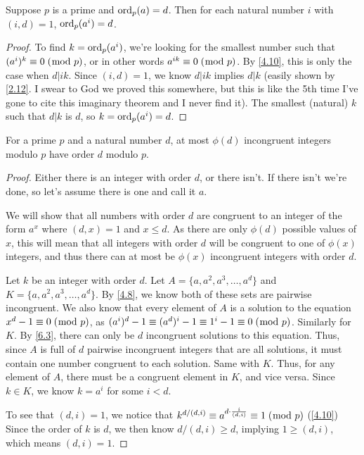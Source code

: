 \documentclass[../main.tex]{subfiles}
\begin{document}
\begin{thm} \label{6.4}
  Suppose $p$ is a prime and $\operatorname{ord}_p (a) = d$. Then for each natural number $i$ with $(i, d) = 1$, $\operatorname{ord}_p(a^i) = d$.
\end{thm}

\begin{proof}
  To find $k = \operatorname{ord}_p (a^i)$, we're looking for the smallest number such that $(a^i)^k \equiv 0 \; (\bmod \; p)$, or in other words $a^{ik} \equiv 0 \; (\bmod \; p)$. By \ref{4.10}, this is only the case when $d | ik$. Since $(i, d) = 1$, we know $d | ik$ implies $d | k$ (easily shown by \ref{2.12}. I swear to God we proved this somewhere, but this is like the 5th time I've gone to cite this imaginary theorem and I never find it). The smallest (natural) $k$ such that $d | k$ is $d$, so $k = \operatorname{ord}_p (a^i) = d$.
\end{proof}



\pagebreak



\begin{thm} \label{6.5}
  For a prime $p$ and a natural number $d$, at most $\phi (d)$ incongruent integers modulo $p$ have order $d$ modulo $p$.
\end{thm}

\begin{proof}
  Either there is an integer with order $d$, or there isn't. If there isn't we're done, so let's assume there is one and call it $a$.

  We will show that all numbers with order $d$ are congruent to an integer of the form $a^x$ where $(d, x) = 1$ and $x \leq d$. As there are only $\phi(d)$ possible values of $x$, this will mean that all integers with order $d$ will be congruent to one of $\phi(x)$ integers, and thus there can at most be $\phi(x)$ incongruent integers with order $d$.

  Let $k$ be an integer with order $d$. Let $A = \{a, a^2, a^3, \ldots, a^d\}$ and $K = \{a, a^2, a^3, \ldots, a^d\}$. By \ref{4.8}, we know both of these sets are pairwise incongruent. We also know that every element of $A$ is a solution to the equation $x^d - 1 \equiv 0 \; (\bmod \; p)$, as $(a^i)^d - 1 \equiv (a^d)^i - 1 \equiv 1^i - 1 \equiv 0 \; (\bmod \; p)$. Similarly for $K$.
  By \ref{6.3}, there can only be $d$ incongruent solutions to this equation. Thus, since $A$ is full of $d$ pairwise incongruent integers that are all solutions, it must contain one number congruent to each solution. Same with $K$. Thus, for any element of $A$, there must be a congruent element in $K$, and vice versa. Since $k \in K$, we know $k = a^i$ for some $i < d$.

  To see that $(d, i) = 1$, we notice that $k^{d/(d,i)} \equiv a^{d \cdot \frac{i}{(d,i)}} \equiv 1 \; (\bmod \; p)$ (\ref{4.10}) Since the order of $k$ is $d$, we then know $d/(d,i) \geq d$, implying $1 \geq (d,i)$, which means $(d,i) = 1$.
\end{proof}
\end{document}

